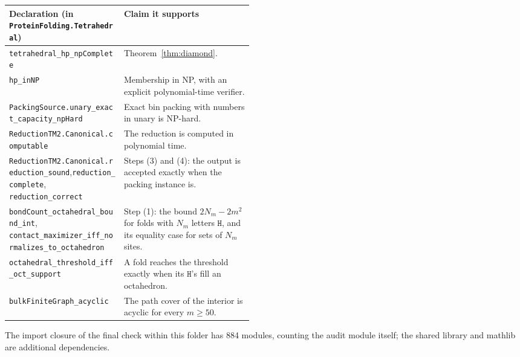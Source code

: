 \documentclass[11pt,letterpaper]{article}
\theoremstyle{definition}
\theoremstyle{remark}
\newcommand{\Hh}{\mathtt{H}}
\newcommand{\lean}[1]{\texttt{#1}}
\begin{document}
\begin{center}\footnotesize
\begin{tabularx}{\linewidth}{@{}>{\raggedright\arraybackslash}p{0.47\linewidth}>{\raggedright\arraybackslash}X@{}}
\toprule
Declaration (in \lean{ProteinFolding.Tetrahedral}) & Claim it supports\\
\midrule
\lean{tetrahedral\_hp\_npComplete} & Theorem~\ref{thm:diamond}.\\
\lean{hp\_inNP} & Membership in NP, with an explicit polynomial-time verifier.\\
\lean{PackingSource.\allowbreak unary\_exact\_capacity\_npHard} & Exact bin packing with numbers in
  unary is NP-hard.\\
\lean{ReductionTM2.Canonical.computable} & The reduction is computed in polynomial time.\\
\lean{ReductionTM2.Canonical.reduction\_sound},\newline \lean{reduction\_complete},
  \lean{reduction\_correct} & Steps (3) and (4): the output is accepted exactly when the packing
  instance is.\\
\lean{bondCount\_octahedral\_bound\_int},\newline
  \lean{contact\_maximizer\_iff\_\allowbreak normalizes\_to\_octahedron} & Step (1): the bound
  $2N_m-2m^2$ for folds with $N_m$ letters $\Hh$, and its equality case for sets of $N_m$ sites.\\
\lean{octahedral\_threshold\_iff\_oct\_support} & A fold reaches the threshold exactly when its
  $\Hh$'s fill an octahedron.\\
\lean{bulkFiniteGraph\_acyclic} & The path cover of the interior is acyclic for every $m\ge50$.\\
\bottomrule
\end{tabularx}
\end{center}
\noindent The import closure of the final check within this folder has 884 modules, counting the
audit module itself; the shared library and mathlib are additional dependencies.
\end{document}
